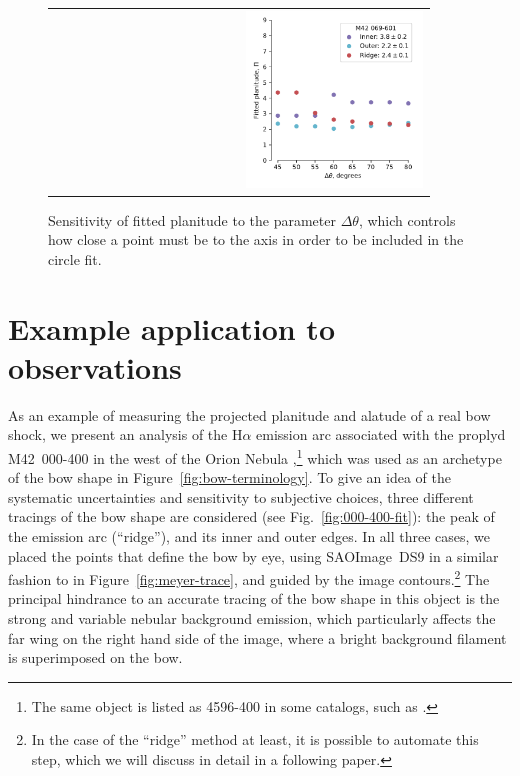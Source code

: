 \begin{figure}
\begin{tabular}{p{0.45\linewidth} p{0.45\linewidth}}
    & \includegraphics[width=\linewidth]{figs/069-601-Pi-vs-Dtheta}
  \end{tabular}
  \caption[]{Sensitivity of fitted planitude to the parameter
    \(\Delta\theta\), which controls how close a point must be to the axis in
    order to be included in the circle fit. }
  \label{fig:000-400-Delta-theta}
\end{figure}

\section{Example application to observations}
\label{sec:obs}


As an example of measuring the projected planitude and alatude of a
real bow shock, we present an analysis of the H\(\alpha\) emission arc
associated with the proplyd M42~000-400 in the west of the Orion
Nebula \citep{Bally:2000a},\footnote{%
  The same object is listed as 4596-400 in some catalogs, such as
  \citet{Ricci:2008a}.  } %
which was used as an archetype of the bow shape in
Figure~\ref{fig:bow-terminology}.  To give an idea of the systematic
uncertainties and sensitivity to subjective choices, three different
tracings of the bow shape are considered (see
Fig.~\ref{fig:000-400-fit}): the peak of the emission arc (``ridge''),
and its inner and outer edges.  In all three
cases, we placed the points that define the bow by eye, using
SAOImage~DS9 in a similar fashion to in Figure~\ref{fig:meyer-trace},
and guided by the image contours.\footnote{%
  In the case of the ``ridge'' method at least, it is possible to
  automate this step, which we will discuss in detail in a following
  paper. } %
The principal hindrance to an accurate tracing of the bow shape in
this object is the strong and variable nebular background emission,
which particularly affects the far wing on the right hand side of the
image, where a bright background filament is superimposed on the bow.

